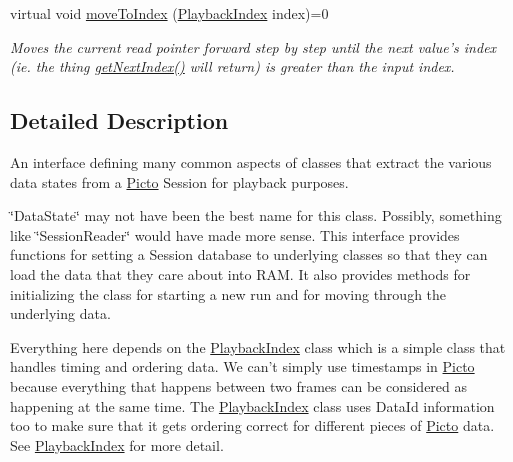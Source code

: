 \begin{DoxyCompactItemize}
virtual void \hyperlink{class_picto_1_1_data_state_af18625b354552d5123f46bde3ded65e0}{move\-To\-Index} (\hyperlink{struct_picto_1_1_playback_index}{Playback\-Index} index)=0
\begin{DoxyCompactList}\small\item\em Moves the current read pointer forward step by step until the next value's index (ie. the thing \hyperlink{class_picto_1_1_data_state_a959c083fdf897e2f8d75be596d9db8e0}{get\-Next\-Index()} will return) is greater than the input index. \end{DoxyCompactList}\end{DoxyCompactItemize}


\subsection{Detailed Description}
An interface defining many common aspects of classes that extract the various data states from a \hyperlink{namespace_picto}{Picto} Session for playback purposes. 

\char`\"{}\-Data\-State\char`\"{} may not have been the best name for this class. Possibly, something like \char`\"{}\-Session\-Reader\char`\"{} would have made more sense. This interface provides functions for setting a Session database to underlying classes so that they can load the data that they care about into R\-A\-M. It also provides methods for initializing the class for starting a new run and for moving through the underlying data.

Everything here depends on the \hyperlink{struct_picto_1_1_playback_index}{Playback\-Index} class which is a simple class that handles timing and ordering data. We can't simply use timestamps in \hyperlink{namespace_picto}{Picto} because everything that happens between two frames can be considered as happening at the same time. The \hyperlink{struct_picto_1_1_playback_index}{Playback\-Index} class uses Data\-Id information too to make sure that it gets ordering correct for different pieces of \hyperlink{namespace_picto}{Picto} data. See \hyperlink{struct_picto_1_1_playback_index}{Playback\-Index} for more detail.

